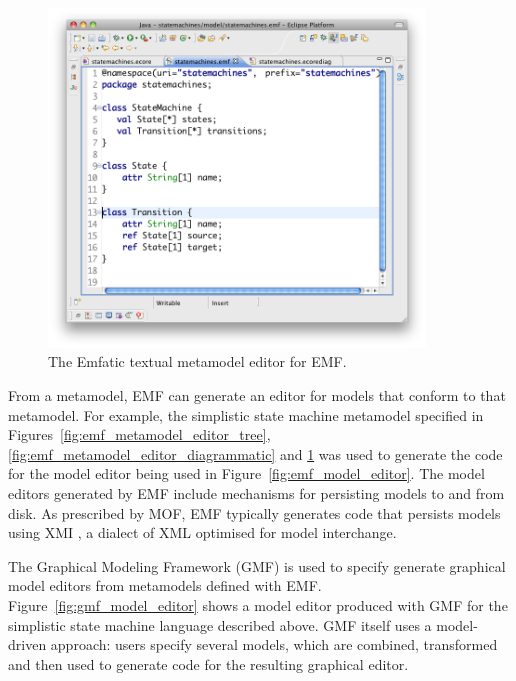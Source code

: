 \begin{figure}[htbp]
  \begin{center}
    \leavevmode
    \includegraphics[width=10cm]{2.Background/images/emf_metamodel_textual.png}
  \end{center}
  \caption{The Emfatic textual metamodel editor for EMF.}
  \label{fig:emf_metamodel_editor_textual}
\end{figure}

From a metamodel, EMF can generate an editor for models that conform to that metamodel. For example, the simplistic state machine metamodel specified in Figures~\ref{fig:emf_metamodel_editor_tree}, \ref{fig:emf_metamodel_editor_diagrammatic} and \ref{fig:emf_metamodel_editor_textual} was used to generate the code for the model editor being used in Figure~\ref{fig:emf_model_editor}. The model editors generated by EMF include mechanisms for persisting models to and from disk. As prescribed by MOF, EMF typically generates code that persists models using XMI \cite{xmi}, a dialect of XML optimised for model interchange.

The Graphical Modeling Framework (GMF) \cite{gronback09emp} is used to specify generate graphical model editors from metamodels defined with EMF. Figure~\ref{fig:gmf_model_editor} shows a model editor produced with GMF for the simplistic state machine language described above. GMF itself uses a model-driven approach: users specify several models, which are combined, transformed and then used to generate code for the resulting graphical editor. 

